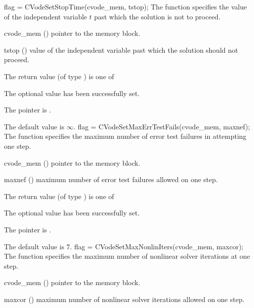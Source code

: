 {
flag = CVodeSetStopTime(cvode\_mem, tstop);
}
{
  The function  specifies the value of the
  independent variable $t$ past which the solution is not to proceed.
}
{
  \begin{args}
  \item[cvode\_mem] ()
    pointer to the {\cvode} memory block.
  \item[tstop] ()
    value of the independent variable past which the solution should
    not proceed.
  \end{args}
}
{
  The return value  (of type ) is one of
  \begin{args}
  \item[\Id{CV\_SUCCESS}] 
    The optional value has been successfully set.
  \item[\Id{CV\_MEM\_NULL}]
    The  pointer is .
  \end{args}
}
{
  The default value is $\infty$.
}
{
flag = CVodeSetMaxErrTestFails(cvode\_mem, maxnef);
}
{
  The function  specifies the
  maximum number of error test failures in attempting one step.
}
{
  \begin{args}
  \item[cvode\_mem] ()
    pointer to the {\cvode} memory block.
  \item[maxnef] ()
    maximum number of error test failures allowed on one step.
  \end{args}
}
{
  The return value  (of type ) is one of
  \begin{args}
  \item[\Id{CV\_SUCCESS}] 
    The optional value has been successfully set.
  \item[\Id{CV\_MEM\_NULL}]
    The  pointer is .
  \end{args}
}
{
  The default value is $7$.
}
{
flag = CVodeSetMaxNonlinIters(cvode\_mem, maxcor);
}
{
  The function  specifies the maximum
  number of nonlinear solver iterations at one step.
}
{
  \begin{args}
  \item[cvode\_mem] ()
    pointer to the {\cvode} memory block.
  \item[maxcor] ()
    maximum number of nonlinear solver iterations allowed on one step.
  \end{args}
}
